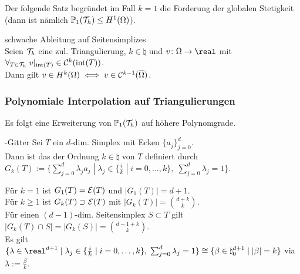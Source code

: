 \linie

\begin{Bem}
    Der folgende Satz begründet im Fall $k = 1$ die Forderung der globalen Stetigkeit
    (dann ist nämlich $\mathbb{P}_1(\mathcal{T}_h) \le H^1(\Omega)$).
\end{Bem}

\begin{Satz}{schwache Ableitung auf Seitensimplizes}\\
    Seien $\mathcal{T}_h$ eine zul. Triangulierung,
    $k \in \natural$ und
    $v\colon \Omega \to \real$ mit
    $\forall_{T \in \mathcal{T}_h}\; v|_{\operatorname{int}(T)} \in \mathcal{C}^k(\operatorname{int}(T))$.\\
    Dann gilt $v \in H^k(\Omega) \iff v \in \mathcal{C}^{k-1}(\overline{\Omega})$.
\end{Satz}

\pagebreak

\subsubsection{%
    Polynomiale Interpolation auf Triangulierungen%
}

\begin{Bem}
    Es folgt eine Erweiterung von $\mathbb{P}_1(\mathcal{T}_h)$ auf höhere Polynomgrade.
\end{Bem}

\begin{Def}{-Gitter}
    Sei $T$ ein $d$-dim. Simplex mit Ecken $\{a_j\}_{j=0}^d$.\\
    Dann ist das  der Ordnung $k \in \natural$ von $T$
    definiert durch\\
    $G_k(T) := \{\sum_{j=0}^d \lambda_j a_j \;|\;
    \lambda_j \in \{\frac{i}{k} \;|\; i = 0, \dotsc, k\},\; \sum_{j=0}^d \lambda_j = 1\}$.
\end{Def}

\begin{Bem}
    Für $k = 1$ ist $G_1(T) = \mathcal{E}(T)$ und $|G_1(T)| = d+1$.\\
    Für $k \ge 1$ ist $G_k(T) \supset \mathcal{E}(T)$ mit $|G_k(T)| = \binom{d+k}{k}$.\\
    Für einen $(d-1)$-dim. Seitensimplex $S \subset T$ gilt
    $|G_k(T) \cap S| = |G_k(S)| = \binom{d-1+k}{k}$.\\
    Es gilt
    $\{\lambda \in \real^{d+1} \;|\; \lambda_j \in \{\frac{i}{k} \;|\; i = 0, \dotsc, k\},\;
    \sum_{j=0}^d \lambda_j = 1\} \cong
    \{\beta \in \natural_0^{d+1} \;|\; |\beta| = k\}$ via
    $\lambda := \frac{\beta}{k}$.
\end{Bem}


